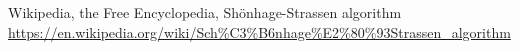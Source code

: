 \documentclass[a4paper]{article}
\begin{document}
\begin{thebibliography}{9}
 Wikipedia, the Free Encyclopedia, Shönhage-Strassen algorithm \\ \url{https://en.wikipedia.org/wiki/Sch\%C3\%B6nhage\%E2\%80\%93Strassen_algorithm}


\end{thebibliography}
\end{document}
